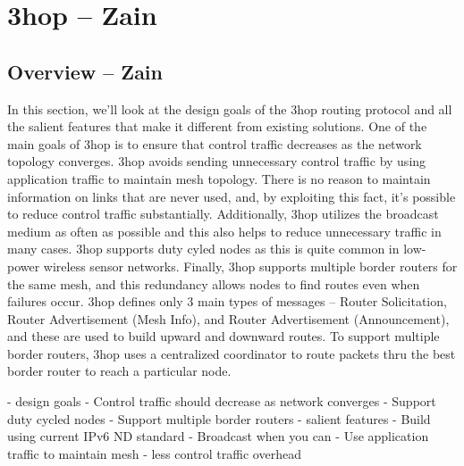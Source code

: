 \section{3hop -- Zain}

\subsection{Overview -- Zain}
In this section, we'll look at the design goals of the 3hop routing protocol and all the salient features that make it different from existing solutions. 
One of the main goals of 3hop is to ensure that control traffic decreases as the network topology converges. 
3hop avoids sending unnecessary control traffic by using application traffic to maintain mesh topology. 
There is no reason to maintain information on links that are never used, and, by exploiting this fact, it's possible to reduce control traffic substantially. 
Additionally, 3hop utilizes the broadcast medium as often as possible and this also helps to reduce unnecessary traffic in many cases.
3hop supports duty cyled nodes as this is quite common in low-power wireless sensor networks.
Finally, 3hop supports multiple border routers for the same mesh, and this redundancy allows nodes to find routes even when failures occur.
3hop defines only 3 main types of messages -- Router Solicitation, Router Advertisement (Mesh Info), and Router Advertisement (Announcement), and these are used to build upward and downward routes.
To support multiple border routers, 3hop uses a centralized coordinator to route packets thru the best border router to reach a particular node.

- design goals
    - Control traffic should decrease as network converges
    - Support duty cycled nodes
    - Support multiple border routers
- salient features
    - Build using current IPv6 ND standard
    - Broadcast when you can
    - Use application traffic to maintain mesh
    - less control traffic overhead
\fi

